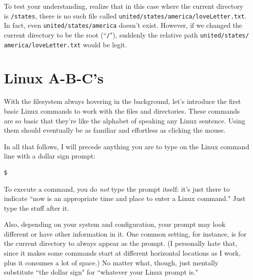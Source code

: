 To test your understanding, realize that in this case where the current
directory is \texttt{/states}, there is no such file called
\texttt{united/states/america/loveLetter.txt}. In fact, even 
\texttt{united/states/america} doesn't exist. However, if we changed the
current directory to be the root (``\texttt{/}"), suddenly the relative path
\texttt{united/states/ america/loveLetter.txt} would be legit.

\section{Linux A-B-C's}

With the filesystem always hovering in the background, let's introduce the
first basic Linux commands to work with the files and directories. These
commands are so basic that they're like the alphabet of speaking any Linux
sentence. Using them should eventually be as familiar and effortless as
clicking the mouse.

In all that follows, I will precede anything you are to type on the Linux
command line with a dollar sign prompt:

\begin{verbatim}
$
\end{verbatim}

To execute a command, you do \textit{not} type the prompt itself: it's just
there to indicate ``now is an appropriate time and place to enter a Linux
command." Just type the stuff after it.

Also, depending on your system and configuration, your prompt may look
different or have other information in it. One common setting, for instance,
is for the current directory to always appear as the prompt. (I personally
hate that, since it makes some commands start at different horizontal
locations as I work, plus it consumes a lot of space.) No matter what, though,
just mentally substitute ``the dollar sign" for ``whatever your Linux prompt
is."

\newcommand{\bigline}{\begin{center} \line(1,0){300} \end{center}}


